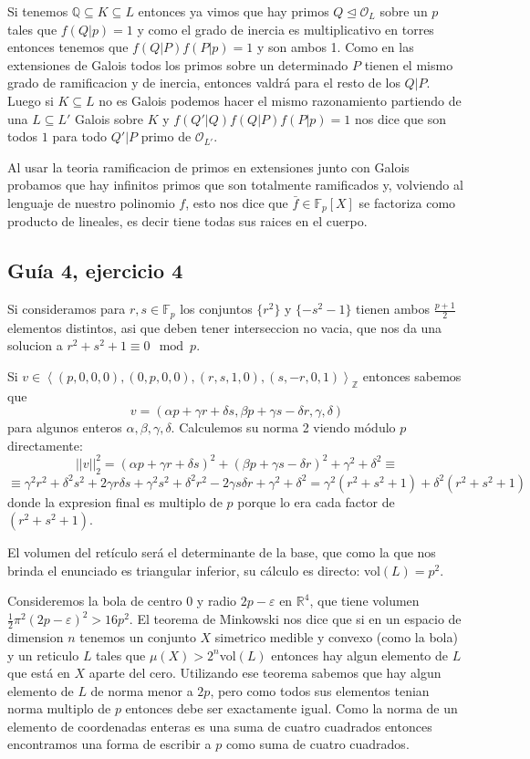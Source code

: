 \documentclass[12pt]{amsart}
\newcommand{\QQ}{\mathbb{Q}}
\newcommand{\RR}{\mathbb{R}}
\newcommand{\ZZ}{\mathbb{Z}}
\newcommand{\FF}{\mathbb{F}}
\newcommand{\OO}{\mathcal{O}}
\newcommand{\lc}{\left<}
\newcommand{\rc}{\right>}
\theoremstyle{plain}
\begin{document}
Si tenemos $\QQ\subseteq K\subseteq L$ entonces ya vimos que hay primos
$Q \unlhd \OO_L$ sobre un $p$ tales que $f(Q | p)=1$ y como el grado 
de inercia es multiplicativo en torres entonces 
tenemos que $f(Q | P)f(P|p)=1$ y son ambos 1. Como en las extensiones de 
Galois todos los primos sobre un determinado $P$ tienen el mismo grado 
de ramificacion y de inercia, entonces valdrá para el resto de los $Q|P$.
Luego si $K\subseteq L$ no es Galois podemos hacer el mismo razonamiento
partiendo de una $L\subseteq L'$ Galois sobre $K$ y $f(Q' | Q)f(Q | P)
f(P|p)=1$ nos dice que son todos $1$ para todo $Q'|P$ primo de $\OO_{L'}$.

Al usar la teoria ramificacion de primos en extensiones junto con Galois probamos que hay infinitos primos que son totalmente ramificados y, volviendo al lenguaje de nuestro polinomio $f$, esto nos dice que $\bar{f}\in \FF_p[X]$ se factoriza como producto de lineales, es decir tiene todas sus raices en el cuerpo.

\subsection*{Guía 4, ejercicio 4}

Si consideramos para $r,s\in \FF_p$ los conjuntos $\{r^2\}$ y $\{-s^2-1\}$ tienen ambos $\frac{p+1}{2}$ elementos distintos, asi que deben tener interseccion no vacia, que nos da una solucion a $r^2+s^2+1\equiv0 \mod p$.

Si $v\in \lc (p,0,0,0),(0,p,0,0),(r,s,1,0),(s,-r,0,1) \rc_\ZZ$ entonces sabemos que 
$$v=(\alpha p + \gamma r + \delta s , \beta p + \gamma s - \delta r ,\gamma,\delta)$$
para algunos enteros $\alpha,\beta,\gamma,\delta$. Calculemos su norma 2 viendo módulo $p$ directamente:
$$||v||_2^2 = (\alpha p + \gamma r + \delta s)^2 + (\beta p + \gamma s - \delta r)^2 +\gamma^2+\delta^2 \equiv $$
$$\equiv \gamma^2 r^2 + \delta^2 s^2 + 2\gamma r \delta s
+ \gamma^2 s^2 + \delta^2 r^2 - 2\gamma s \delta r
+\gamma^2+\delta^2 = \gamma^2(r^2+s^2+1) + \delta^2(r^2+s^2+1)$$
donde la expresion final es multiplo de $p$ porque lo era cada factor de $(r^2+s^2+1)$. 

El volumen del retículo será el determinante de la base, que como la que nos brinda el enunciado es triangular inferior, su cálculo es directo: vol$(L)=p^2$.

Consideremos la bola de centro 0 y radio $2p-\varepsilon$ en $\RR^4$, que tiene volumen $\frac{1}{2}\pi^2 (2p-\varepsilon)^2>16p^2$. El teorema de Minkowski nos dice que si en un espacio de dimension $n$ tenemos un conjunto $X$ simetrico medible y convexo (como la bola) y un reticulo $L$ tales que $\mu(X)>2^n$vol$(L)$ entonces hay algun elemento de $L$ que está en $X$ aparte del cero. Utilizando ese teorema sabemos que hay algun elemento de $L$ de norma menor a $2p$, pero como todos sus elementos tenian norma multiplo de $p$ entonces debe ser exactamente igual. Como la norma de un elemento de coordenadas enteras es una suma de cuatro cuadrados entonces encontramos una forma de escribir a $p$ como suma de cuatro cuadrados.
\end{document}
